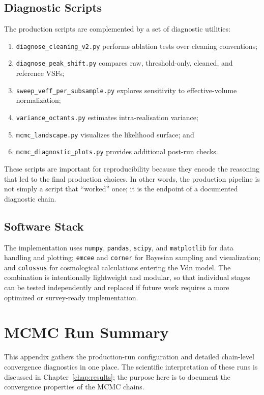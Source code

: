 \documentclass[12pt]{report}
\begin{document}
\section{Diagnostic Scripts}

The production scripts are complemented by a set of diagnostic utilities:
\begin{enumerate}
    \item \texttt{diagnose\_cleaning\_v2.py} performs ablation tests over cleaning conventions;
    \item \texttt{diagnose\_peak\_shift.py} compares raw, threshold-only, cleaned, and reference VSFs;
    \item \texttt{sweep\_veff\_per\_subsample.py} explores sensitivity to effective-volume normalization;
    \item \texttt{variance\_octants.py} estimates intra-realisation variance;
    \item \texttt{mcmc\_landscape.py} visualizes the likelihood surface; and
    \item \texttt{mcmc\_diagnostic\_plots.py} provides additional post-run checks.
\end{enumerate}

These scripts are important for reproducibility because they encode the reasoning that led to the final production choices. In other words, the production pipeline is not simply a script that ``worked'' once; it is the endpoint of a documented diagnostic chain.

\section{Software Stack}

The implementation uses \texttt{numpy}, \texttt{pandas}, \texttt{scipy}, and \texttt{matplotlib} for data handling and plotting; \texttt{emcee} and \texttt{corner} for Bayesian sampling and visualization; and \texttt{colossus} for cosmological calculations entering the Vdn model. The combination is intentionally lightweight and modular, so that individual stages can be tested independently and replaced if future work requires a more optimized or survey-ready implementation.


\chapter{MCMC Run Summary}
\label{app:mcmc_summary}

This appendix gathers the production-run configuration and detailed chain-level convergence diagnostics in one place. The scientific interpretation of these runs is discussed in Chapter~\ref{chap:results}; the purpose here is to document the convergence properties of the MCMC chains.
\end{document}
